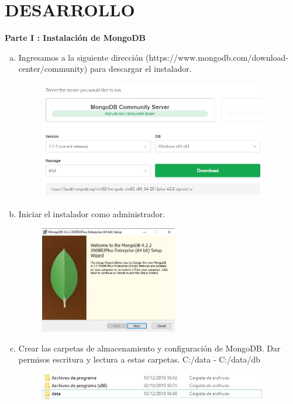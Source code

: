 \documentclass[preprint,12pt]{elsarticle}
\begin{document}
\section{DESARROLLO}
\textbf{Parte I : Instalación de MongoDB}
\begin{enumerate}[a)]
\item Ingresamos a la siguiente dirección (https://www.mongodb.com/download-center/community) para descargar el instalador.
\begin{figure}[htb]
	\begin{center}
		\includegraphics[width=10cm]{./IMAGENES/Mongo01}
	\end{center}
\end{figure}
\item Iniciar el instalador como administrador.
\begin{figure}[htb]
	\begin{center}
		\includegraphics[width=6cm]{./IMAGENES/Mongo02}
	\end{center}
\end{figure}

\item Crear las carpetas de almacenamiento y configuración de MongoDB.
Dar permisos escritura y lectura a estas carpetas.
C:/data - C:/data/db
\begin{figure}[htb]
	\begin{center}
		\includegraphics[width=10cm]{./IMAGENES/Mongo03}
	\end{center}
\end{figure}


\end{enumerate}
\end{document}
